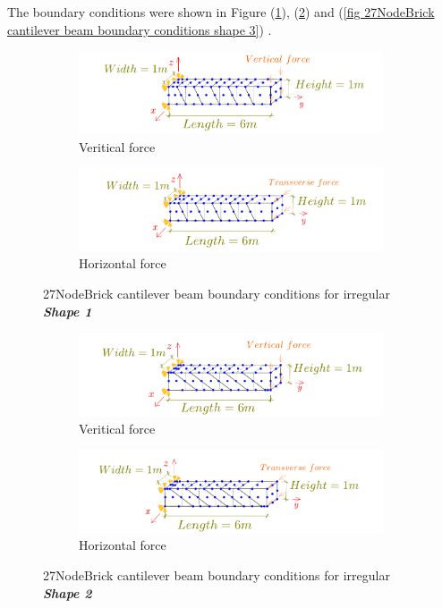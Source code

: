 \documentclass[fleqn,11pt,letter]{article}
\begin{document}
The boundary conditions were shown in Figure (\ref{fig 27NodeBrick cantilever beam boundary conditions shape 1}), (\ref{fig 27NodeBrick cantilever beam boundary conditions shape 2}) and (\ref{fig 27NodeBrick cantilever beam boundary conditions shape 3}) .

\begin{figure}[H]
  \centering
    \begin{subfigure}{0.5\textwidth}
      \centering
      \includegraphics[width=9cm]{../Figure_files/27NodeBrick/beam_brick27_shape1_vertical.pdf}
      \caption{Veritical force}
    \end{subfigure}
    \begin{subfigure}{0.5\textwidth}
      \centering
      \includegraphics[width=9cm]{../Figure_files/27NodeBrick/beam_brick27_shape1_horizontal.pdf}
      \caption{Horizontal force}
    \end{subfigure}
  \caption{27NodeBrick cantilever beam boundary conditions for irregular \textbf{\emph{Shape 1}} }
  \label{fig 27NodeBrick cantilever beam boundary conditions shape 1}
\end{figure}


\begin{figure}[H]
  \centering
    \begin{subfigure}{0.5\textwidth}
      \centering
      \includegraphics[width=9cm]{../Figure_files/27NodeBrick/beam_brick27_shape2_vertical.pdf}
      \caption{Veritical force}
    \end{subfigure}
    \begin{subfigure}{0.5\textwidth}
      \centering
      \includegraphics[width=9cm]{../Figure_files/27NodeBrick/beam_brick27_shape2_horizontal.pdf}
      \caption{Horizontal force}
    \end{subfigure}
  \caption{27NodeBrick cantilever beam boundary conditions for irregular \textbf{\emph{Shape 2}} }
  \label{fig 27NodeBrick cantilever beam boundary conditions shape 2}
\end{figure}
\end{document}
